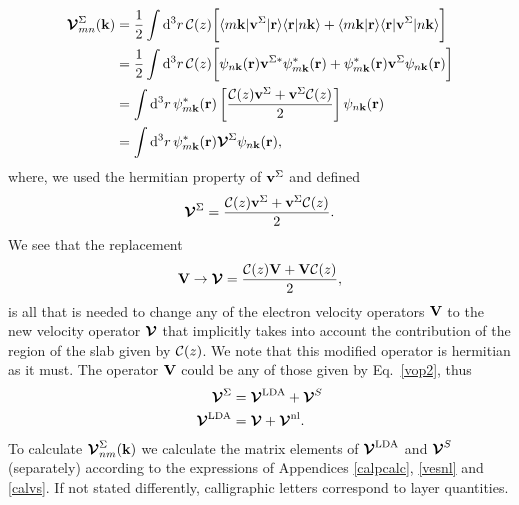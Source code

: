 \documentclass[floatfix,prb,aps,superscriptaddress,11pt,preprint,letterpaper]{revtex4}
\begin{document}
\begin{align}\label{intj}
{\boldsymbol{\mathcal{V}}}^{\Sigma}_{mn}({\mathbf k})
&=
\frac{1}{2}
\int \mathrm{d}^3 r\,
 {\mathbf{\cal C}}(z)
\bigg[
\langle m\mathbf{k}|\mathbf{v}^\Sigma | \mathbf{r}\rangle
\langle \mathbf{r} | n \mathbf k \rangle +
\langle m\mathbf{k} | \mathbf{r}\rangle
\langle \mathbf{r} | \mathbf{v}^\Sigma | n \mathbf k \rangle\bigg]
\nonumber\\
&=
\frac{1}{2}
\int \mathrm{d}^3 r\,
 {\mathbf{\cal C}}(z)
 \bigg[
\psi_{n\mathbf{k}}(\mathbf{r})
\mathbf{v}^{\Sigma *}\psi^*_{m\mathbf{k}}(\mathbf{r})
+ 
\psi^*_{m\mathbf{k}}(\mathbf{r})\mathbf{v}^\Sigma
\psi_{n\mathbf{k}}(\mathbf{r})
\bigg]
\nonumber\\
&=
\int \mathrm{d}^3 r\,
\psi^*_{m\mathbf{k}}(\mathbf{r})
\left[\frac{{\mathbf{\cal C}}(z) \mathbf{v}^\Sigma +
\mathbf{v}^\Sigma {\mathbf{\cal C}}(z)}{2}\right]
\psi_{n\mathbf{k}}(\mathbf{r})
\nonumber\\
&=
\int \mathrm{d}^3 r\,
\psi^*_{m\mathbf{k}}(\mathbf{r})
\boldsymbol{\mathcal{\cal V}}^{\Sigma}
\psi_{n\mathbf{k}}(\mathbf{r})
,
\end{align}
where, we used the hermitian property of $\mathbf{v}^\Sigma$ and defined
\begin{align}\label{nl.4}
\boldsymbol{\mathcal{\cal V}}^{\Sigma}
=
\frac{{\mathbf{\cal C}}(z) \mathbf{v}^\Sigma +
\mathbf{v}^\Sigma {\mathbf{\cal C}}(z)}{2}
.
\end{align} 
We see that the replacement
\begin{align}\label{vcali}
\mathbf{V} \to \boldsymbol{\mathcal{\cal V}}=\frac{{\mathbf{\cal C}}(z) \mathbf{V} +
\mathbf{V} {\mathbf{\cal C}}(z)}{2}
,
\end{align} 
is all that is needed to change any of the
electron velocity operators $\mathbf{V}$ to the new velocity
operator $\boldsymbol{\mathcal{\cal V}}$ that implicitly takes into account the
contribution of the region of the slab given by ${\mathbf{\cal C}}(z)$.
We note that this modified operator is hermitian as it must.\cite{note2}
The operator $\mathbf{V}$ could be any of those given by Eq.~\eqref{vop2},
thus
\begin{align}\label{vopii}
\boldsymbol{\mathcal{\cal V}}^{\Sigma}
&=
\boldsymbol{\mathcal{\cal V}}^{\mathrm{LDA}}
+
\boldsymbol{\mathcal{\cal V}}^{S}
\nonumber\\
\boldsymbol{\mathcal{\cal V}}^{\mathrm{LDA}}
&=
\boldsymbol{\mathcal{\cal V}}
+
\boldsymbol{\mathcal{\cal V}}^{\mathrm{nl}}
.
\end{align}
To calculate
$\boldsymbol{\mathcal{\cal V}}^{\Sigma}_{nm}(\mathbf{k})$ 
we calculate the matrix elements of 
$\boldsymbol{\mathcal{\cal V}}^{\mathrm{LDA}}$ and $\boldsymbol{\mathcal{\cal V}}^{S}$
 (separately)
according to the expressions of
Appendices \ref{calpcalc}, \ref{vesnl} and \ref{calvs}.
If not stated differently, calligraphic letters correspond to layer quantities. 
\end{document}
